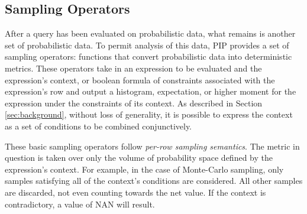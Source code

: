 %
%
%


\subsection{Sampling Operators}
After a query has been evaluated on probabilistic data, what remains is another set of probabilistic data.  To permit analysis of this data, PIP provides a set of sampling operators: functions that convert probabilistic data into deterministic metrics.  These operators take in an expression to be evaluated and the expression's context, or boolean formula of constraints associated with the expression's row and output a histogram, expectation, or higher moment for the expression under the constraints of its context.  As described in Section \ref{sec:background}, without loss of generality, it is possible to express the context as a set of conditions to be combined conjunctively.  

These basic sampling operators follow \textit{per-row sampling semantics}.  The metric in question is taken over only the volume of probability space defined by the expression's context.  For example, in the case of Monte-Carlo sampling, only samples satisfying all of the context's conditions are considered.  All other samples are discarded, not even counting towards the net value.  If the context is contradictory, a value of NAN will result.

